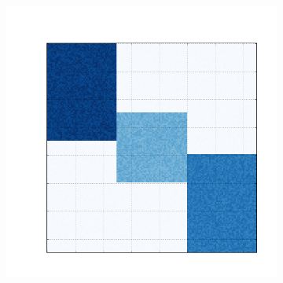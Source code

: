 \documentclass[
    12pt,                %
    oneside,            %
    a4paper,            %
    english,            %
    brazil                %
    ]{abntex2ppgsi}
\begin{document}
\begin{figure}[H]
\begin{subfigure}[b]{0.18\textwidth}
    \end{subfigure}
    \begin{subfigure}[b]{0.18\textwidth}
        \includegraphics[width=\textwidth]{img/e-bic-structure.png}
    \end{subfigure}


\end{figure}
\end{document}
